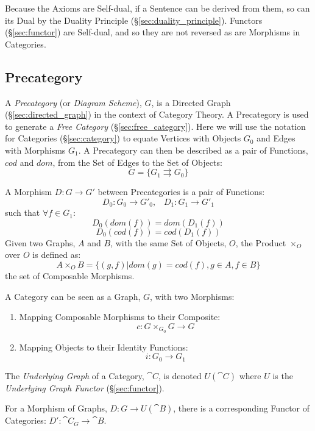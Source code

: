 Because the Axioms are Self-dual, if a Sentence can be derived from
them, so can its Dual by the Duality Principle
(\S\ref{sec:duality_principle}). Functors (\S\ref{sec:functor}) are
Self-dual, and so they are not reversed as are Morphisms in
Categories.



\subsection{Precategory}\label{sec:precategory}

A \emph{Precategory} (or \emph{Diagram Scheme}), $G$, is a Directed
Graph (\S\ref{sec:directed_graph}) in the context of Category
Theory. A Precategory is used to generate a \emph{Free Category}
(\S\ref{sec:free_category}). Here we will use the notation for
Categories (\S\ref{sec:category}) to equate Vertices with
Objects $G_0$ and Edges with Morphisms $G_1$. A Precategory can then
be described as a pair of Functions, $cod$ and $dom$, from the Set of
Edges to the Set of Objects:
\[
  G = \{G_1 \rightrightarrows G_0\}
\]

A Morphism $D : G \rightarrow G'$ between Precategories is a pair of
Functions:
\[
  D_0 : G_0 \rightarrow G'_0, \;\;\; D_1 : G_1 \rightarrow G'_1
\]
such that $\forall f \in G_1$:
\[
  D_0(dom(f)) = dom(D_1(f))
\]\[
  D_0(cod(f)) = cod(D_1(f))
\]
Given two Graphs, $A$ and $B$, with the same Set of Objects, $O$, the
Product $\times_O$ over $O$ is defined as:
\[
  A \times_O B = \{ (g,f) | dom(g) = cod(f), g \in A, f \in B \}
\]
the set of Composable Morphisms.

A Category can be seen as a Graph, $G$, with two Morphisms:
\begin{enumerate}
  \item Mapping Composable Morphisms to their Composite:
    \[c : G \times_{G_0} G \rightarrow G\]
  \item Mapping Objects to their Identity Functions:
    \[i: G_0 \rightarrow G_1\]
\end{enumerate}
The \emph{Underlying Graph} of a Category, $\cat{C}$, is denoted
$U(\cat{C})$ where $U$ is the \emph{Underlying Graph Functor}
(\S\ref{sec:functor}).

For a Morphism of Graphs, $D : G \rightarrow U(\cat{B})$, there is
a corresponding Functor of Categories: $D' : \cat{C}_G \rightarrow
\cat{B}$.

